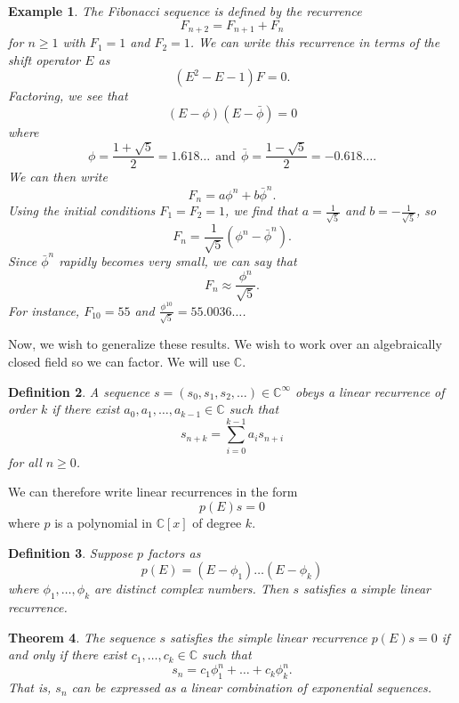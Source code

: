 \documentclass[11pt]{article}
\newtheorem{theorem}{Theorem}
\newtheorem{definition}[theorem]{Definition}
\newtheorem{example}[theorem]{Example}
\newcommand{\C}{\mathbb C} %
\begin{document}
\begin{example}
The Fibonacci sequence is defined by the recurrence
$$F_{n+2} = F_{n+1} + F_n$$ for $n \geq 1$ with $F_1 = 1$ and $F_2 = 1$.  We can write this recurrence in terms of the shift operator $E$ as
$$(E^2 - E - 1)F = 0.$$  Factoring, we see that
$$(E - \phi)(E - \bar{\phi}) = 0$$ where 
$$\phi = \frac{1 + \sqrt{5}}{2} = 1.618\ldots~~\text{and}~~\bar{\phi} = \frac{1 - \sqrt{5}}{2} = -0.618\ldots.$$
We can then write
$$F_n = a\phi^n + b\bar{\phi}^n.$$  Using the initial conditions $F_1 = F_2 = 1$, we find that $a = \frac{1}{\sqrt{5}}$ and $b = -\frac{1}{\sqrt{5}}$, so
$$F_n = \frac{1}{\sqrt{5}}(\phi^n - \bar{\phi}^n).$$
Since $\bar{\phi}^n$ rapidly becomes very small, we can say that
$$F_n \approx \frac{\phi^n}{\sqrt{5}}.$$
For instance, $F_{10} = 55$ and $\frac{\phi^{10}}{\sqrt{5}} = 55.0036\ldots$.
\end{example}

Now, we wish to generalize these results.  We wish to work over an algebraically closed field so we can factor.  We will use $\C$.

\begin{definition}
A sequence $s = (s_0, s_1, s_2, \ldots) \in \C^\infty$ obeys a linear recurrence of order $k$ if there exist $a_0, a_1, \ldots, a_{k-1} \in \C$ such that
$$s_{n+k} = \sum_{i=0}^{k-1}{a_i s_{n+i}}$$ for all $n \geq 0$.
\end{definition}

We can therefore write linear recurrences in the form
$$ p(E)s = 0$$ where $p$ is a polynomial in $\C[x]$ of degree $k$.

\begin{definition}
Suppose $p$ factors as
$$p(E) = (E - \phi_1)\ldots(E - \phi_k)$$ where $\phi_1, \ldots, \phi_k$ are distinct complex numbers.  Then $s$ satisfies a simple linear recurrence.
\end{definition}

\begin{theorem}
The sequence $s$ satisfies the simple linear recurrence $p(E)s = 0$ if and only if there exist $c_1, \ldots, c_k \in \C$ such that
$$s_n = c_1\phi_1^n + \ldots + c_k\phi_k^n.$$  That is, $s_n$ can be expressed as a linear combination of exponential sequences.
\end{theorem}
\end{document}
